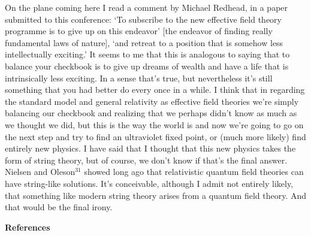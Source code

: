 On the plane coming here I read a comment by Michael
Redhead, in a paper submitted to this conference: `To
subscribe to the new effective field theory programme is to
give up on this endeavor' [the endeavor of finding really
fundamental laws of nature], `and retreat to a position that
is somehow less intellectually exciting.'   It seems to me
that this is analogous to saying that to balance your
checkbook is to give up dreams of wealth and have a life
that is intrinsically less exciting.  In a sense that's
true,  but nevertheless it's still something that
you had better do every once in a while.  I think that in
regarding the standard model and general relativity as
effective field theories we're simply balancing our
checkbook and realizing that we perhaps didn't know as much
as we thought we did,  but this is the way the world is and
now we're going to go on the next step and try to find an
ultraviolet fixed point, or (much more likely) find entirely
new physics.     I have said that I thought that this new
physics takes the form of  string theory,  but of course, we
don't know if that's the final answer.   Nielsen and
Oleson$^{31}$
showed long ago that relativistic quantum field theories can
have string-like solutions.   It's conceivable, although I
admit not entirely likely,  that something like modern
string theory arises from a quantum field theory.  And that
would be the final irony.



\pagebreak

\begin{center}
{\bf References}
\end{center}


